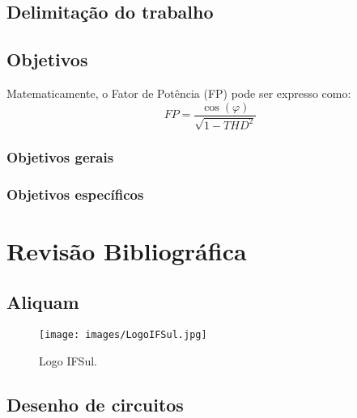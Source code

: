 \section{Delimitação do trabalho}

\section{Objetivos}

Matematicamente, o Fator de Potência (FP) pode ser expresso como:
\begin{equation}
	\label{eq:k-55}
    {
    \displaystyle 
    FP = \frac{\cos(\varphi)}{\sqrt{1 - THD^2}}
    }
\end{equation}

\subsection{Objetivos gerais}

\subsection{Objetivos específicos}


\chapter{Revisão Bibliográfica}

\section{Aliquam}

\lipsum[2-3]

\begin{figure}[htp]
	\centering
	\caption{\label{fig:inrush-fig02} Logo IFSul.}
	\texttt{[image: images/LogoIFSul.jpg]}
\end{figure}

\section{Desenho de circuitos}

